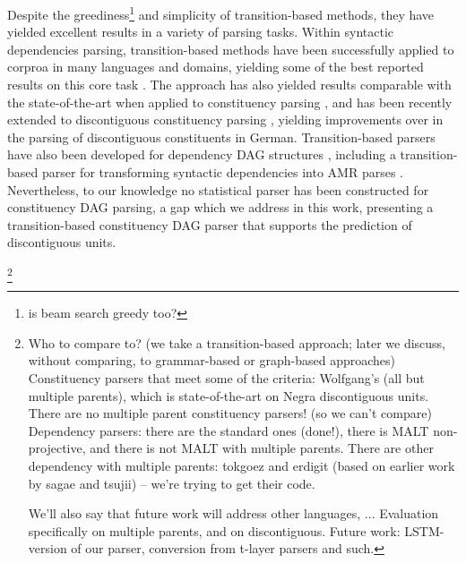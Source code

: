 \documentclass[11pt]{article}
\newcommand{\oa}[1]{\footnote{\color{red} #1}}
\newcommand{\daniel}[1]{\footnote{\color{blue} #1}}
\begin{document}
Despite the greediness\daniel{is beam search greedy too?} and simplicity of transition-based methods, they have yielded excellent
results in a variety of parsing tasks. Within syntactic dependencies parsing, transition-based methods
have been successfully applied to corproa in many languages and domains, yielding some
of the best reported results on this core task \cite{dyer2015transition,ballesteros2015improved}. 
The approach has also yielded results comparable with the state-of-the-art when applied
to constituency parsing \cite{sagae2005classifier,zhu2013fast}, and has been recently extended to
discontiguous constituency parsing \cite{maier2015discontinuous},
yielding improvements over in the parsing of discontiguous constituents in German.
Transition-based parsers have also been developed for dependency DAG structures
\cite{sagae2008shift,tokgoz2015transition}, including a transition-based parser for transforming
syntactic dependencies into AMR parses \cite{wang2015transition}.
Nevertheless, to our knowledge no statistical parser has
been constructed for constituency DAG parsing, a gap which
we address in this work, presenting a transition-based constituency DAG parser that supports
the prediction of discontiguous units.

\oa{Who to compare to? (we take a transition-based approach; later we discuss,
  without comparing, to grammar-based
  or graph-based approaches)
  Constituency parsers that meet some of the criteria: Wolfgang's (all but multiple parents),
        which is state-of-the-art on Negra discontiguous units.
        There are no multiple parent constituency parsers! (so we can't compare)
  Dependency parsers: there are the standard ones (done!), there is MALT non-projective, and there is not MALT with multiple parents. There are other dependency with multiple parents: tokgoez and erdigit (based on earlier work by sagae and tsujii) -- we're trying to get their code.
  
  We'll also say that future work will address other languages, ...
  Evaluation specifically on multiple parents, and on discontiguous.
  Future work: LSTM-version of our parser, conversion from t-layer parsers and such.
}

\end{document}
